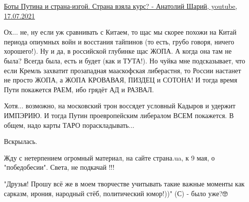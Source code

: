 \begin{itemize}
 

\href{https://www.youtube.com/watch?v=RlH_kf_lUS8}{%
Боты Путина и страна-изгой. Страна взяла курс? - Анатолий Шарий, youtube, 17.07.2021}

 

Ох... не, ну если уж сравнивать с Китаем, то щас мы скорее похожи на Китай
периода опиумных войн и восстания тайпинов (то есть, грубо говоря, ничего
хорошего!). Ну и да, в российской глубинке щас ЖОПА. А когда она там не была?
Всегда была, есть и будет (как и ТУТА!). Но чуйка мне подсказывает, что если
Кремль захватит прозападная мааскофская либерастня, то России настанет не
просто ЖОПА, а ЖОПА КРОВАВАЯ, ПИЗДЕЦ и СОТОНА! И тогда время Пути покажется
РАЕМ, ибо грядёт АД и РАЗВАЛ. 

Хотя... возможно, на московский трон воссядет условный Кадыров и удержит
ИМПЭРИЮ. И тогда Путин проевропейским либералом ВСЕМ покажется. В общем, надо
карты ТАРО пораскладывать...

 
Вскрылась.

 
Жду с нетерпением огромный материал, на сайте страна.ua, к 9 мая, о "победобесии". Света, не подкачай !!!

 
"Друзья! Прошу всё же в моем творчестве учитывать такие важные моменты как сарказм, ирония, народный стёб, политический юмор!))" (С) - было уже?🤓


\end{itemize}

